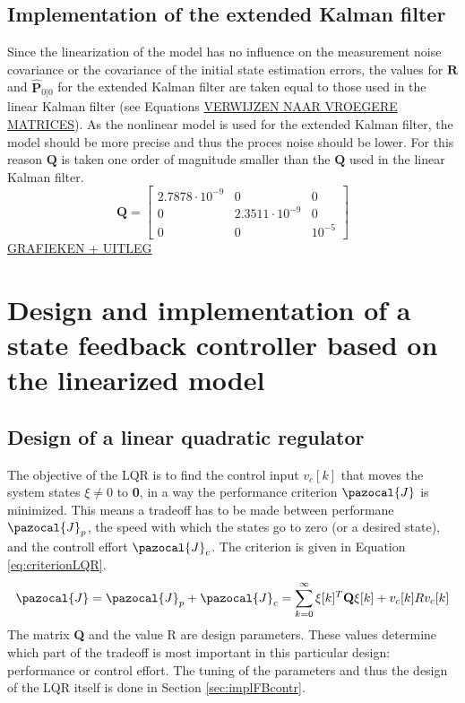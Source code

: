 \documentclass[a4paper,kul]{kulakarticle} %
\newcommand{\J}{\pazocal{J}}
\begin{document}
\subsection{Implementation of the extended Kalman filter}
Since the linearization of the model has no influence on the measurement noise covariance or the covariance of the initial state estimation errors, the values for $\mathbf{R}$ and $\mathbf{\hat{P}}_{0|0}$ for the extended Kalman filter are taken equal to those used in the linear Kalman filter (see Equations \underline{VERWIJZEN NAAR VROEGERE MATRICES}). As the nonlinear model is used for the extended Kalman filter, the model should be more precise and thus the proces noise should be lower. For this reason $\mathbf{Q}$ is taken one order of magnitude smaller than the $\mathbf{Q}$ used in the linear Kalman filter. 
\begin{equation}
	\mathbf{Q} = \begin{bmatrix}
	2.7878\cdot10^{-9}&0&0\\0&2.3511\cdot10^{-9}&0\\0&0&10^{-5}
	\end{bmatrix}
	\end{equation}
	\underline{GRAFIEKEN + UITLEG}
	
	\section{Design and implementation of a state feedback controller based on the linearized model}
	\subsection{Design of a linear quadratic regulator}
	\label{sec:designLQR}
	The objective of the LQR is to find the control input $v_c[k]$ that moves the system states $\xi \neq 0$ to \textbf{0}, in a way the performance criterion $\J$ is minimized. This means a tradeoff has to be made between performane $\J_p$, the speed with which the states go to zero (or a desired state), and the controll effort $\J_c$. The criterion is given in Equation \ref{eq:criterionLQR}. 
	\begin{equation}
	\J = \J_p + \J_c =  \sum_{k=0}^{\infty}\mathbf{\xi}[k]^T\mathbf{Q}\mathbf{\xi}[k] + v_c[k]Rv_c[k]
	\label{eq:criterionLQR}
	\end{equation}
	The matrix \textbf{Q} and the value R are design parameters. These values determine which part of the tradeoff is most important in this particular design: performance or control effort. The tuning of the parameters and thus the design of the LQR itself is done in Section \ref{sec:implFBcontr}. 
	
\end{document}
